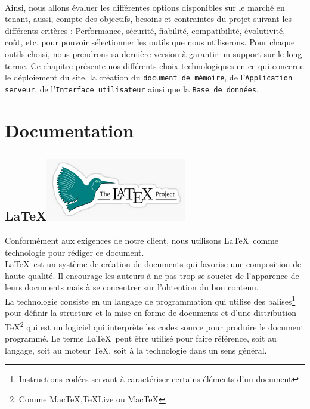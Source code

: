 	\paragraph{}Ainsi, nous allons \'evaluer les diff\'erentes options disponibles sur le march\'e en tenant, aussi, compte des objectifs, besoins et contraintes du projet suivant les diff\'erents crit\`eres : Performance, s\'ecurit\'e, fiabilit\'e, compatibilit\'e, \'evolutivit\'e, co\^ut, etc. pour pouvoir s\'electionner les outils que nous utiliserons. Pour chaque outils choisi, nous prendrons sa derni\`ere version \`a garantir un support sur le long terme. Ce chapitre pr\'esente nos diff\'erents choix technologiques en ce qui concerne le d\'eploiement du site, la cr\'eation du \texttt{document de m\'emoire}, de l'\texttt{Application serveur}, de l'\texttt{Interface utilisateur} ainsi que la \texttt{Base de donn\'ees}.
	
	\section{Documentation}
	
		\subsection{\LaTeX \includegraphics[height=2ex]{Pictures/latexLogo.png}}
			Conform\'ement aux exigences de notre client, nous utilisons \LaTeX\ comme technologie pour r\'ediger ce document.\\
			
			\LaTeX\ est un syst\`eme de cr\'eation de documents qui favorise une composition de haute qualit\'e. Il encourage les auteurs \`a ne pas trop se soucier de l'apparence de leurs documents mais \`a se concentrer sur l'obtention du bon contenu\cite{LatexOfficiel}.\\
			La technologie consiste en un langage de programmation qui utilise des balises\footnote{Instructions cod\'ees servant \`a caract\'eriser certains \'el\'ements d'un document\cite{BalisesLeRobert}} pour d\'efinir la structure et la mise en forme de documents et d'une distribution \TeX\footnote{Comme Mac\TeX ,\TeX Live ou Mac\TeX} qui est un logiciel qui interpr\`ete les codes source pour produire le document programm\'e. Le terme \LaTeX\ peut \^etre utilis\'e pour faire r\'ef\'erence, soit au langage, soit au moteur \TeX , soit \`a la technologie dans un sens g\'en\'eral.
	

